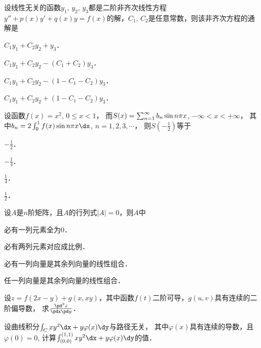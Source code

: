 \documentclass[plain,noanswer,medmath]{../../template/jnuexam}
\begin{document}
\begin{problem}
设线性无关的函数$y_1$, $y_2$, $y_3$都是二阶非齐次线性方程
$y''+p(x) y'+q(x)y=f(x)$的解，$C_1$, $C_2$是任意常数，则该非齐次方程的通解是\pickout{}
\begin{abcd}
\item $C_1y_1+C_2y_2+y_3$．
\item $C_1y_1+C_2y_2-(C_1+C_2)y_3$．
\item $C_1y_1+C_2y_2-(1-C_1-C_2)y_3$．
\item $C_1y_1+C_2y_2+(1-C_1-C_2)y_3$．
\end{abcd}
\end{problem}


\begin{problem}
设函数$f(x)=x^2$, $0\le x<1$，
而$\smash[b]{S(x)=\sum_{n=1}^{\infty}b_n\sin n\pi x}$, $-\infty <x<+\infty$，
其中$b_n=2\int_0^1f(x)\sin n\pi x\dx$, $n=1,2,3,\cdots$，
则$S\left(-\frac{1}{2}\right)$等于\pickout{}
\begin{abcd}
\item $-\frac{1}{2}$．
\item $-\frac{1}{4}$．
\item $\frac{1}{4}$．
\item $\frac{1}{2}$．
\end{abcd}
\end{problem}


\begin{problem}
设$A$是$n$阶矩阵，且$A$的行列式$|A|=0$，则$A$中\pickout{}
\begin{abcd}
\item 必有一列元素全为$0$．
\item 必有两列元素对应成比例．
\item 必有一列向量是其余列向量的线性组合．
\item 任一列向量是其余列向量的线性组合．
\end{abcd}
\end{problem}




\begin{problem}
设$z=f(2x-y)+g(x,xy)$，其中函数$f(t)$二阶可导，$g(u,v)$具有连续的二阶偏导数，
求$\frac{\pd^2 z}{\pdx\pd y}$．
\end{problem}


\begin{problem}
设曲线积分$\int_C xy^2 \dx+y\varphi(x)\dy$与路径无关，
其中$\varphi (x)$具有连续的导数，且$\varphi (0)=0$,
计算$\int_{(0,0)}^{(1,1)}xy^2 \dx+y\varphi(x)\dy$的值．
\end{problem}
\end{document}
